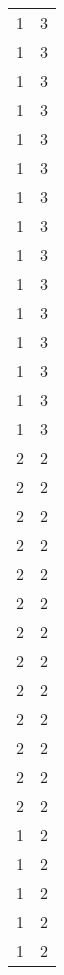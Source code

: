 \begin{tabular}{rr}
                  1 &             3 \\
                  1 &             3 \\
                  1 &             3 \\
                  1 &             3 \\
                  1 &             3 \\
                  1 &             3 \\
                  1 &             3 \\
                  1 &             3 \\
                  1 &             3 \\
                  1 &             3 \\
                  1 &             3 \\
                  1 &             3 \\
                  1 &             3 \\
                  1 &             3 \\
                  1 &             3 \\
                  2 &             2 \\
                  2 &             2 \\
                  2 &             2 \\
                  2 &             2 \\
                  2 &             2 \\
                  2 &             2 \\
                  2 &             2 \\
                  2 &             2 \\
                  2 &             2 \\
                  2 &             2 \\
                  2 &             2 \\
                  2 &             2 \\
                  2 &             2 \\
                  1 &             2 \\
                  1 &             2 \\
                  1 &             2 \\
                  1 &             2 \\
                  1 &             2 \\

\end{tabular}
